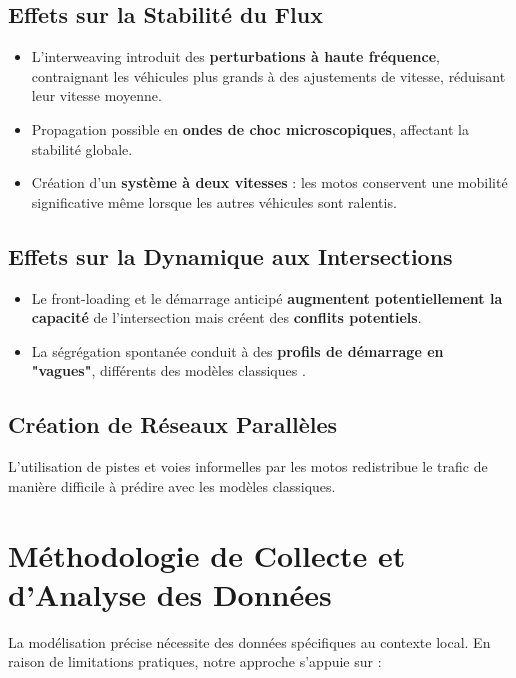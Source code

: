 \subsection{Effets sur la Stabilité du Flux}
\label{subsec:effets_stabilite}
\begin{itemize}
    \item L'interweaving introduit des \textbf{perturbations à haute fréquence}, contraignant les véhicules plus grands à des ajustements de vitesse, réduisant leur vitesse moyenne.
    \item Propagation possible en \textbf{ondes de choc microscopiques}, affectant la stabilité globale.
    \item Création d'un \textbf{système à deux vitesses} : les motos conservent une mobilité significative même lorsque les autres véhicules sont ralentis.
\end{itemize}

\subsection{Effets sur la Dynamique aux Intersections}
\label{subsec:effets_intersections}
\begin{itemize}
    \item Le front-loading et le démarrage anticipé \textbf{augmentent potentiellement la capacité} de l'intersection mais créent des \textbf{conflits potentiels}.
    \item La ségrégation spontanée conduit à des \textbf{profils de démarrage en "vagues"}, différents des modèles classiques \cite{akcelik2003relationship}.
\end{itemize}

\subsection{Création de Réseaux Parallèles}
\label{subsec:reseaux_paralleles}
L'utilisation de pistes et voies informelles par les motos redistribue le trafic de manière difficile à prédire avec les modèles classiques.

\section{Méthodologie de Collecte et d'Analyse des Données}
\label{sec:collecte_donnees} %

La modélisation précise nécessite des données spécifiques au contexte local. En raison de limitations pratiques, notre approche s'appuie sur :

